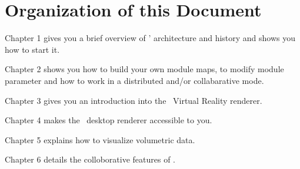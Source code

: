 \documentclass[a4paper]{../covise}
\begin{document}
\begin{latexonly}
\begin{titlepage}
\end{titlepage}

\tableofcontents

\chapter*{Organization of this Document}
Chapter 1
gives you a brief overview of \covise' architecture and history and shows you
how to start it.

Chapter 2
shows you how to build your own module maps, to modify module parameter and how
to work in a distributed and/or collabarative mode.

Chapter 3
gives you an introduction into the \covise\  Virtual Reality renderer.

Chapter 4
makes the \covise\ desktop renderer accessible to you.

Chapter 5
explains how to visualize volumetric data.

Chapter 6
details the colloborative features of \covise.

	
\end{latexonly}


	
		
	

	
	
\end{document}
